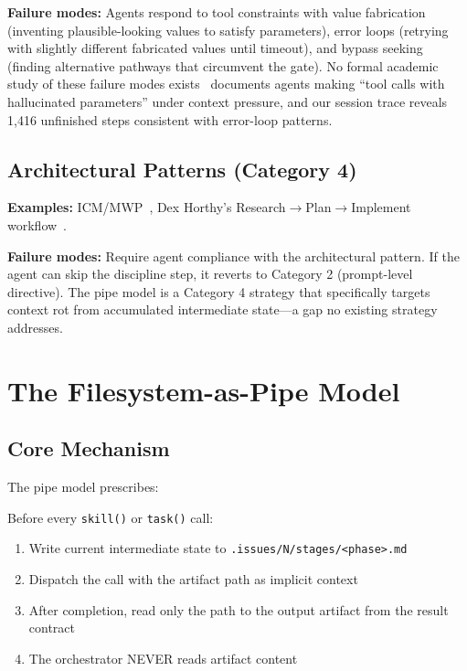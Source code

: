 \documentclass[11pt,a4paper]{article}
\begin{document}
\textbf{Failure modes:} Agents respond to tool constraints with value fabrication (inventing plausible-looking values to satisfy parameters), error loops (retrying with slightly different fabricated values until timeout), and bypass seeking (finding alternative pathways that circumvent the gate). No formal academic study of these failure modes exists~\cite{redis2026} documents agents making ``tool calls with hallucinated parameters'' under context pressure, and our session trace reveals 1,416 unfinished steps consistent with error-loop patterns.

\subsection{Architectural Patterns (Category 4)}
\textbf{Examples:} ICM/MWP~\cite{vanclief2026}, Dex Horthy's Research$\to$Plan$\to$Implement workflow~\cite{liu2026}.

\textbf{Failure modes:} Require agent compliance with the architectural pattern. If the agent can skip the discipline step, it reverts to Category 2 (prompt-level directive). The pipe model is a Category 4 strategy that specifically targets context rot from accumulated intermediate state---a gap no existing strategy addresses.

\section{The Filesystem-as-Pipe Model}
\label{sec:model}

\subsection{Core Mechanism}
The pipe model prescribes:

\begin{bluebox}
Before every \texttt{skill()} or \texttt{task()} call:
\begin{enumerate}[nosep]
  \item Write current intermediate state to \texttt{.issues/N/stages/<phase>.md}
  \item Dispatch the call with the artifact path as implicit context
  \item After completion, read only the path to the output artifact from the result contract
  \item The orchestrator NEVER reads artifact content
\end{enumerate}
\end{bluebox}
\end{document}
